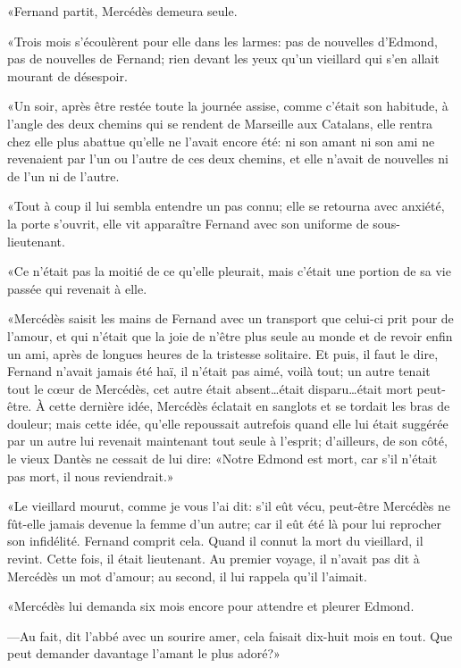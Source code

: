 «Fernand partit, Mercédès demeura seule.

«Trois mois s'écoulèrent pour elle dans les larmes: pas de nouvelles d'Edmond, pas de nouvelles de Fernand; rien devant les yeux qu'un vieillard qui s'en allait mourant de désespoir.

«Un soir, après être restée toute la journée assise, comme c'était son habitude, à l'angle des deux chemins qui se rendent de Marseille aux Catalans, elle rentra chez elle plus abattue qu'elle ne l'avait encore été: ni son amant ni son ami ne revenaient par l'un ou l'autre de ces deux chemins, et elle n'avait de nouvelles ni de l'un ni de l'autre.

«Tout à coup il lui sembla entendre un pas connu; elle se retourna avec anxiété, la porte s'ouvrit, elle vit apparaître Fernand avec son uniforme de sous-lieutenant.

«Ce n'était pas la moitié de ce qu'elle pleurait, mais c'était une portion de sa vie passée qui revenait à elle.

«Mercédès saisit les mains de Fernand avec un transport que celui-ci prit pour de l'amour, et qui n'était que la joie de n'être plus seule au monde et de revoir enfin un ami, après de longues heures de la tristesse solitaire. Et puis, il faut le dire, Fernand n'avait jamais été haï, il n'était pas aimé, voilà tout; un autre tenait tout le cœur de Mercédès, cet autre était absent\dots était disparu\dots était mort peut-être. À cette dernière idée, Mercédès éclatait en sanglots et se tordait les bras de douleur; mais cette idée, qu'elle repoussait autrefois quand elle lui était suggérée par un autre lui revenait maintenant tout seule à l'esprit; d'ailleurs, de son côté, le vieux Dantès ne cessait de lui dire: «Notre Edmond est mort, car s'il n'était pas mort, il nous reviendrait.»

«Le vieillard mourut, comme je vous l'ai dit: s'il eût vécu, peut-être Mercédès ne fût-elle jamais devenue la femme d'un autre; car il eût été là pour lui reprocher son infidélité. Fernand comprit cela. Quand il connut la mort du vieillard, il revint. Cette fois, il était lieutenant. Au premier voyage, il n'avait pas dit à Mercédès un mot d'amour; au second, il lui rappela qu'il l'aimait.

«Mercédès lui demanda six mois encore pour attendre et pleurer Edmond.

—Au fait, dit l'abbé avec un sourire amer, cela faisait dix-huit mois en tout. Que peut demander davantage l'amant le plus adoré?»

